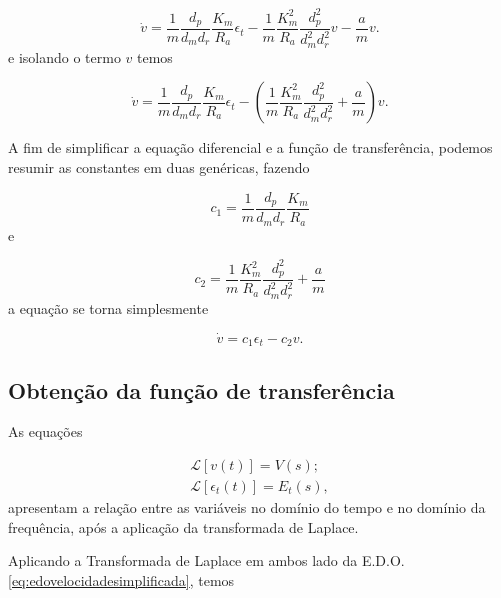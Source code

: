         \begin{equation}
            \dot v = \frac{1}{m} \frac{d_p}{d_m d_r} \frac{K_m}{R_a} \epsilon_t - \frac{1}{m} \frac{K_m^2}{R_a}\frac{d_p^2}{d_m^2 d_r^2} v - \frac{a}{m}v.
        \end{equation}
        e isolando o termo $v$ temos
        
        \begin{equation}
            \dot v = \frac{1}{m} \frac{d_p}{d_m d_r} \frac{K_m}{R_a} \epsilon_t - ( \frac{1}{m} \frac{K_m^2}{R_a}\frac{d_p^2}{d_m^2 d_r^2} + \frac{a}{m}) v.
        \end{equation}
        
        A fim de simplificar a equação diferencial e a função de transferência, podemos resumir as constantes em duas genéricas, fazendo
        
        \begin{equation}
            c_1 = \frac{1}{m} \frac{d_p}{d_m d_r} \frac{K_m}{R_a}
        \end{equation}
        e
        
		\begin{equation}
            c_2 = \frac{1}{m} \frac{K_m^2}{R_a}\frac{d_p^2}{d_m^2 d_r^2} + \frac{a}{m}
        \end{equation}
        a equação se torna simplesmente
        
        \begin{equation}
            \dot v = c_1 \epsilon_t - c_2 v.
            \label{eq:edovelocidadesimplificada}
        \end{equation}
        
		\subsection{Obtenção da função de transferência}
		
		    As equações 
		    
		    \begin{eqnarray}
                \mathcal{L} [v(t)] = V(s) ;   \nonumber \\
                \mathcal{L} [ \epsilon_t (t)] = E_t (s),
            \end{eqnarray}
            apresentam a relação entre as variáveis no domínio do tempo e no domínio da frequência, após a aplicação da transformada de Laplace.
            
            Aplicando a Transformada de Laplace em ambos lado da E.D.O. \eqref{eq:edovelocidadesimplificada}, temos
            
